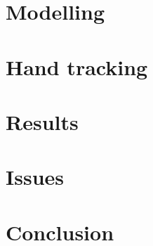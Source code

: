 \documentclass[conference]{IEEEtran}
\begin{document}
    \section{Modelling}\label{sec:modelling}
    

    \section{Hand tracking}\label{sec:hand_tracking}
    

    \section{Results}\label{sec:results}
    

    \section{Issues}\label{sec:issues}
    

    \section{Conclusion}\label{sec:conclusion}
    

    
\end{document}
